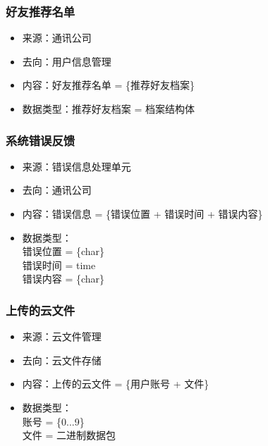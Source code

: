             \subsubsection{好友推荐名单}
            \begin{itemize}
                \item 来源：通讯公司
                \item 去向：用户信息管理
                \item 内容：好友推荐名单 = \{推荐好友档案\}
                \item 数据类型：推荐好友档案 = 档案结构体
            \end{itemize}
            \subsubsection{系统错误反馈}
            \begin{itemize}
                \item 来源：错误信息处理单元
                \item 去向：通讯公司
                \item 内容：错误信息 = \{错误位置 + 错误时间 + 错误内容\}
                \item 数据类型：\\
                错误位置 = \{char\}\\
                错误时间 = time\\
                错误内容 = \{char\}\\
            \end{itemize}
            \subsubsection{上传的云文件}
            \begin{itemize}
            \item 来源：云文件管理
            \item 去向：云文件存储
            \item 内容：上传的云文件 = \{用户账号 + 文件\}
            \item 数据类型：\\
            账号 = \{0...9\}\\
            文件 = 二进制数据包\\
            \end{itemize}

